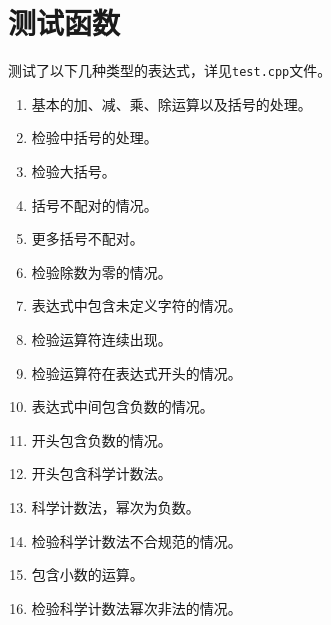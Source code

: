 \documentclass[UTF8]{ctexart}
\begin{document}
\section{测试函数}
测试了以下几种类型的表达式，详见\texttt{test.cpp}文件。
\begin{enumerate}
    \item 基本的加、减、乘、除运算以及括号的处理。
    \item 检验中括号的处理。
    \item 检验大括号。
    \item 括号不配对的情况。
    \item 更多括号不配对。
    \item 检验除数为零的情况。
    \item 表达式中包含未定义字符的情况。
    \item 检验运算符连续出现。
    \item 检验运算符在表达式开头的情况。
    \item 表达式中间包含负数的情况。
    \item 开头包含负数的情况。
    \item 开头包含科学计数法。
    \item 科学计数法，幂次为负数。
    \item 检验科学计数法不合规范的情况。
    \item 包含小数的运算。
    \item 检验科学计数法幂次非法的情况。
\end{enumerate}
\clearpage
\end{document}
